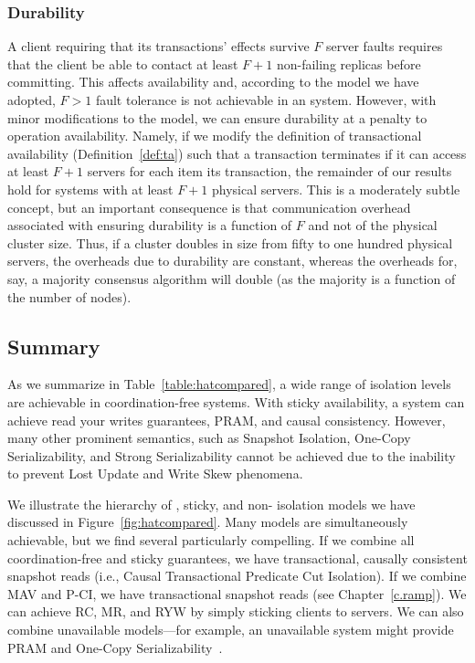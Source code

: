 \subsubsection{Durability}

A client requiring that its transactions' effects survive $F$ server
faults requires that the client be able to contact at least $F+1$
non-failing replicas before committing. This affects availability and,
according to the model we have adopted, $F>1$ fault tolerance is not
achievable in an \iconfluent system. However, with minor modifications
to the model, we can ensure durability at a penalty to operation
availability. Namely, if we modify the definition of transactional
availability (Definition~\ref{def:ta}) such that a transaction
terminates if it can access at least $F+1$ servers for each item its
transaction, the remainder of our results hold for systems with at
least $F+1$ physical servers. This is a moderately subtle concept, but
an important consequence is that communication overhead associated
with ensuring durability is a function of $F$ and not of the physical
cluster size. Thus, if a cluster doubles in size from fifty to one
hundred physical servers, the overheads due to durability are
constant, whereas the overheads for, say, a majority consensus
algorithm will double (as the majority is a function of the number of
nodes).

\subsection{Summary}
\label{sec:hat-summary}

As we summarize in Table~\ref{table:hatcompared}, a wide range of
isolation levels are achievable in coordination-free systems. With sticky
availability, a system can achieve read your writes guarantees,
PRAM, and causal consistency. However, many other prominent semantics,
such as Snapshot Isolation, One-Copy Serializability, and Strong
Serializability cannot be achieved due to the inability to prevent
Lost Update and Write Skew phenomena.

We illustrate the hierarchy of \iconfluent, sticky, and non-\iconfluent
isolation models we have discussed in
Figure~\ref{fig:hatcompared}. Many models are simultaneously
achievable, but we find several particularly compelling. If we combine
all coordination-free and sticky guarantees, we have transactional,
causally consistent snapshot reads (i.e., Causal Transactional
Predicate Cut Isolation). If we combine MAV and P-CI, we have
transactional snapshot reads (see Chapter~\ref{c.ramp}). We can
achieve RC, MR, and RYW by simply sticking clients to servers. We can
also combine unavailable models---for example, an unavailable system
might provide PRAM and One-Copy
Serializability~\cite{daudjee-session}.


